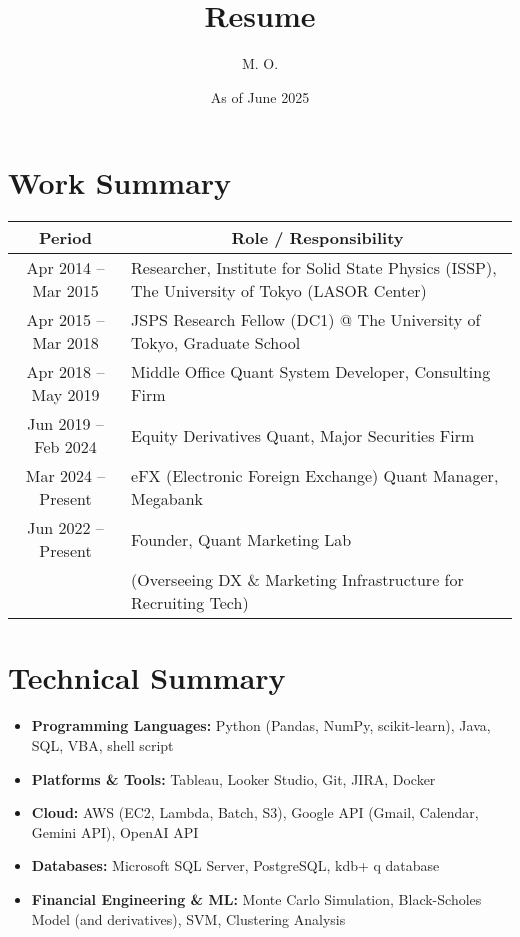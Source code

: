 \documentclass[uplatex,a4j,10.5pt,dvipdfmx]{jsarticle}
\title{\sffamily \bfseries Resume}
\author{M. O.}
\date{As of June 2025}
\begin{document}
\maketitle

\section*{Work Summary}

\begin{longtable}{|c|p{14cm}|}
	\hline
	\multicolumn{1}{|c|}{\textbf{Period}} & \multicolumn{1}{c|}{\textbf{Role / Responsibility}} \\
	\hline
	\endhead

	\hline
	Apr 2014 -- Mar 2015 & Researcher, Institute for Solid State Physics (ISSP), The University of Tokyo (LASOR Center) \\
	\hline
	Apr 2015 -- Mar 2018 & JSPS Research Fellow (DC1) @ The University of Tokyo, Graduate School \\
	\hline
	Apr 2018 -- May 2019 & Middle Office Quant System Developer, Consulting Firm \\
	\hline
	Jun 2019 -- Feb 2024 & Equity Derivatives Quant, Major Securities Firm \\
	\hline
	Mar 2024 -- Present & eFX (Electronic Foreign Exchange) Quant Manager, Megabank \\
    \hline
    Jun 2022 -- Present & Founder, Quant Marketing Lab \\
     & (Overseeing DX \& Marketing Infrastructure for Recruiting Tech) \\
    \hline
\end{longtable}

\section*{Technical Summary}
\begin{itemize}
	\item \textbf{Programming Languages:} Python (Pandas, NumPy, scikit-learn), Java, SQL, VBA, shell script
	\item \textbf{Platforms \& Tools:} Tableau, Looker Studio, Git, JIRA, Docker
	\item \textbf{Cloud:} AWS (EC2, Lambda, Batch, S3), Google API (Gmail, Calendar, Gemini API), OpenAI API
	\item \textbf{Databases:} Microsoft SQL Server, PostgreSQL, kdb+ q database
	\item \textbf{Financial Engineering \& ML:} Monte Carlo Simulation, Black-Scholes Model (and derivatives), SVM, Clustering Analysis
\end{itemize}
\end{document}
